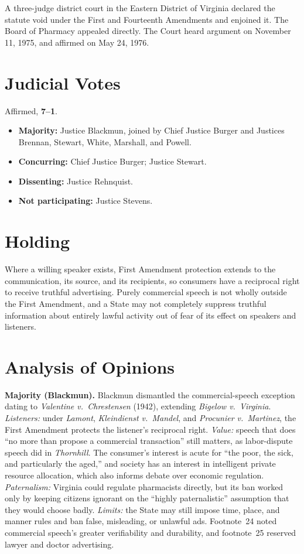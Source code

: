 \documentclass[12pt]{article}
\begin{document}
A three-judge district court in the Eastern District of Virginia declared the statute void under the First and Fourteenth Amendments and enjoined it. The Board of Pharmacy appealed directly. The Court heard argument on November 11, 1975, and affirmed on May 24, 1976.

\section{Judicial Votes}

Affirmed, \textbf{7--1}.
\begin{itemize}
\item \textbf{Majority:} Justice Blackmun, joined by Chief Justice Burger and Justices Brennan, Stewart, White, Marshall, and Powell.
\item \textbf{Concurring:} Chief Justice Burger; Justice Stewart.
\item \textbf{Dissenting:} Justice Rehnquist.
\item \textbf{Not participating:} Justice Stevens.
\end{itemize}

\section{Holding}

Where a willing speaker exists, First Amendment protection extends to the communication, its source, and its recipients, so consumers have a reciprocal right to receive truthful advertising. Purely commercial speech is not wholly outside the First Amendment, and a State may not completely suppress truthful information about entirely lawful activity out of fear of its effect on speakers and listeners.

\section{Analysis of Opinions}

\textbf{Majority (Blackmun).} Blackmun dismantled the commercial-speech exception dating to \textit{Valentine v.\ Chrestensen} (1942), extending \textit{Bigelow v.\ Virginia}. \emph{Listeners:} under \textit{Lamont}, \textit{Kleindienst v.\ Mandel}, and \textit{Procunier v.\ Martinez}, the First Amendment protects the listener's reciprocal right. \emph{Value:} speech that does ``no more than propose a commercial transaction'' still matters, as labor-dispute speech did in \textit{Thornhill}. The consumer's interest is acute for ``the poor, the sick, and particularly the aged,'' and society has an interest in intelligent private resource allocation, which also informs debate over economic regulation. \emph{Paternalism:} Virginia could regulate pharmacists directly, but its ban worked only by keeping citizens ignorant on the ``highly paternalistic'' assumption that they would choose badly. \emph{Limits:} the State may still impose time, place, and manner rules and ban false, misleading, or unlawful ads. Footnote~24 noted commercial speech's greater verifiability and durability, and footnote~25 reserved lawyer and doctor advertising.
\end{document}
